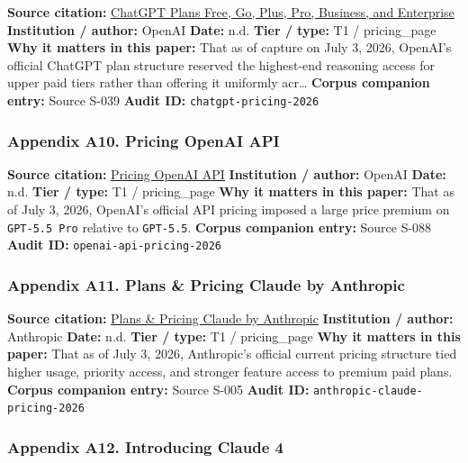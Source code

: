 \documentclass[
  american,
  11pt,
  letterpaper,
]{article}
\begin{document}
\textbf{Source citation:} \href{https://chatgpt.com/pricing/}{ChatGPT
Plans \textbar{} Free, Go, Plus, Pro, Business, and Enterprise}
\textbf{Institution / author:} OpenAI \textbf{Date:} n.d. \textbf{Tier /
type:} T1 / pricing\_page \textbf{Why it matters in this paper:} That as
of capture on July 3, 2026, OpenAI's official ChatGPT plan structure
reserved the highest-end reasoning access for upper paid tiers rather
than offering it uniformly acr\ldots{} \textbf{Corpus companion entry:}
Source S-039 \textbf{Audit ID:} \texttt{chatgpt-pricing-2026}

\subsubsection{Appendix A10. Pricing \textbar{} OpenAI
API}\label{ch-06-appendix-a10-pricing-openai-api}

\textbf{Source citation:}
\href{https://developers.openai.com/api/docs/pricing}{Pricing \textbar{}
OpenAI API} \textbf{Institution / author:} OpenAI \textbf{Date:} n.d.
\textbf{Tier / type:} T1 / pricing\_page \textbf{Why it matters in this
paper:} That as of July 3, 2026, OpenAI's official API pricing imposed a
large price premium on \texttt{GPT-5.5\ Pro} relative to
\texttt{GPT-5.5}. \textbf{Corpus companion entry:} Source S-088
\textbf{Audit ID:} \texttt{openai-api-pricing-2026}

\subsubsection{Appendix A11. Plans \& Pricing \textbar{} Claude by
Anthropic}\label{ch-06-appendix-a11-plans-pricing-claude-by-anthropic}

\textbf{Source citation:} \href{https://claude.com/pricing}{Plans \&
Pricing \textbar{} Claude by Anthropic} \textbf{Institution / author:}
Anthropic \textbf{Date:} n.d. \textbf{Tier / type:} T1 / pricing\_page
\textbf{Why it matters in this paper:} That as of July 3, 2026,
Anthropic's official current pricing structure tied higher usage,
priority access, and stronger feature access to premium paid plans.
\textbf{Corpus companion entry:} Source S-005 \textbf{Audit ID:}
\texttt{anthropic-claude-pricing-2026}

\subsubsection{Appendix A12. Introducing Claude
4}\label{ch-06-appendix-a12-introducing-claude-4}
\end{document}
